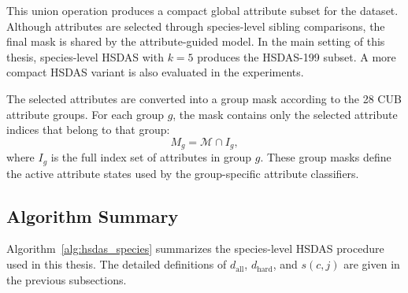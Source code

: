 This union operation produces a compact global attribute subset for the dataset. Although attributes are selected through species-level sibling comparisons, the final mask is shared by the attribute-guided model. In the main setting of this thesis, species-level HSDAS with \(k=5\) produces the HSDAS-199 subset. A more compact HSDAS variant is also evaluated in the experiments.

The selected attributes are converted into a group mask according to the 28 CUB attribute groups. For each group \(g\), the mask contains only the selected attribute indices that belong to that group:
\begin{equation}
    M_g
    =
    \mathcal{M} \cap I_g,
\end{equation}
where \(I_g\) is the full index set of attributes in group \(g\). These group masks define the active attribute states used by the group-specific attribute classifiers.

\subsection{Algorithm Summary}

Algorithm~\ref{alg:hsdas_species} summarizes the species-level HSDAS procedure used in this thesis. The detailed definitions of \(d_{\mathrm{all}}\), \(d_{\mathrm{hard}}\), and \(s(c,j)\) are given in the previous subsections.

